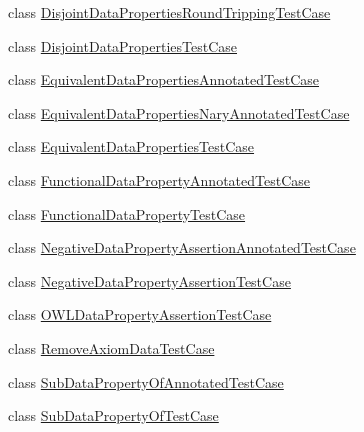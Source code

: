 \begin{DoxyCompactItemize}
\item 
class \hyperlink{classorg_1_1semanticweb_1_1owlapi_1_1api_1_1test_1_1dataproperties_1_1_disjoint_data_properties_round_tripping_test_case}{Disjoint\-Data\-Properties\-Round\-Tripping\-Test\-Case}
\item 
class \hyperlink{classorg_1_1semanticweb_1_1owlapi_1_1api_1_1test_1_1dataproperties_1_1_disjoint_data_properties_test_case}{Disjoint\-Data\-Properties\-Test\-Case}
\item 
class \hyperlink{classorg_1_1semanticweb_1_1owlapi_1_1api_1_1test_1_1dataproperties_1_1_equivalent_data_properties_annotated_test_case}{Equivalent\-Data\-Properties\-Annotated\-Test\-Case}
\item 
class \hyperlink{classorg_1_1semanticweb_1_1owlapi_1_1api_1_1test_1_1dataproperties_1_1_equivalent_data_properties_nary_annotated_test_case}{Equivalent\-Data\-Properties\-Nary\-Annotated\-Test\-Case}
\item 
class \hyperlink{classorg_1_1semanticweb_1_1owlapi_1_1api_1_1test_1_1dataproperties_1_1_equivalent_data_properties_test_case}{Equivalent\-Data\-Properties\-Test\-Case}
\item 
class \hyperlink{classorg_1_1semanticweb_1_1owlapi_1_1api_1_1test_1_1dataproperties_1_1_functional_data_property_annotated_test_case}{Functional\-Data\-Property\-Annotated\-Test\-Case}
\item 
class \hyperlink{classorg_1_1semanticweb_1_1owlapi_1_1api_1_1test_1_1dataproperties_1_1_functional_data_property_test_case}{Functional\-Data\-Property\-Test\-Case}
\item 
class \hyperlink{classorg_1_1semanticweb_1_1owlapi_1_1api_1_1test_1_1dataproperties_1_1_negative_data_property_assertion_annotated_test_case}{Negative\-Data\-Property\-Assertion\-Annotated\-Test\-Case}
\item 
class \hyperlink{classorg_1_1semanticweb_1_1owlapi_1_1api_1_1test_1_1dataproperties_1_1_negative_data_property_assertion_test_case}{Negative\-Data\-Property\-Assertion\-Test\-Case}
\item 
class \hyperlink{classorg_1_1semanticweb_1_1owlapi_1_1api_1_1test_1_1dataproperties_1_1_o_w_l_data_property_assertion_test_case}{O\-W\-L\-Data\-Property\-Assertion\-Test\-Case}
\item 
class \hyperlink{classorg_1_1semanticweb_1_1owlapi_1_1api_1_1test_1_1dataproperties_1_1_remove_axiom_data_test_case}{Remove\-Axiom\-Data\-Test\-Case}
\item 
class \hyperlink{classorg_1_1semanticweb_1_1owlapi_1_1api_1_1test_1_1dataproperties_1_1_sub_data_property_of_annotated_test_case}{Sub\-Data\-Property\-Of\-Annotated\-Test\-Case}
\item 
class \hyperlink{classorg_1_1semanticweb_1_1owlapi_1_1api_1_1test_1_1dataproperties_1_1_sub_data_property_of_test_case}{Sub\-Data\-Property\-Of\-Test\-Case}
\end{DoxyCompactItemize}
